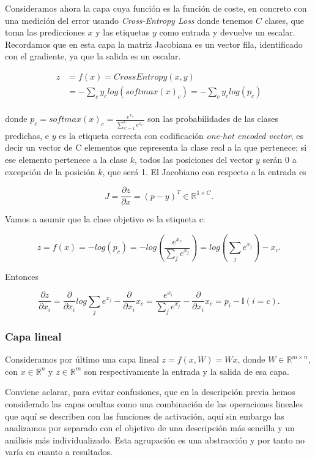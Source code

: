 Consideramos ahora la capa cuya función es la función de coste, en concreto con una medición del error usando \textit{Cross-Entropy Loss} donde tenemos $C$ clases, que toma las predicciones $x$ y las etiquetas $y$ como entrada y devuelve un escalar. Recordamos que en esta capa la matriz Jacobiana es un vector fila, identificado con el gradiente, ya que la salida es un escalar.

\begin{align*}
	z&=f(x)=CrossEntropy(x,y) \\
	&= - \sum_c y_c log(softmax(x)_c) = - \sum_c y_c log(p_c)\\
\end{align*}

donde $p_c=softmax(x)_c= \frac{e^{x_c}}{\sum_{c'=1}^C e^{x_{c'}}}$ son las probabilidades de las clases predichas, e $y$ es la etiqueta correcta con codificación \textit{one-hot encoded vector}, es decir un vector de C elementos que representa la clase real a la que pertenece; si ese elemento pertenece a la clase $k$, todos las posiciones del vector $y$ serán 0 a excepción de la posición $k$, que será 1. El Jacobiano con respecto a la entrada es

$$J= \frac{\partial z}{\partial x}= (p-y)^T \in \mathbb{R}^{1\times C}.$$

Vamos a asumir que la clase objetivo es la etiqueta c:

$$z=f(x)=-log(p_c)=-log \left (\frac{e^{x_c}}{\sum_j e^{x_j}} \right ) = log \left ( \sum_j e^{x_j} \right ) - x_c.$$

Entonces

$$\frac{\partial z}{\partial x_i} = \frac{\partial}{\partial x_i} log \sum_j e^{x_j} - \frac{\partial}{\partial x_i}x_c = \frac{e^{x_i}}{\sum_j e^{x_j}} - \frac{\partial}{\partial x_i}x_c = p_i - \mathbb{I}(i=c).$$

\subsubsection{Capa lineal}



Consideramos por último una capa lineal $z=f(x,W)=Wx$, donde $W \in \mathbb{R}^{m \times n}$, con $x \in \mathbb{R}^n$ y $z \in \mathbb{R}^m$ son respectivamente la entrada y la salida de esa capa.

Conviene aclarar, para evitar confusiones, que en la descripción previa hemos considerado las capas ocultas como una combinación de las operaciones lineales que aquí se describen con las funciones de activación, aquí sin embargo las analizamos por separado con el objetivo de una descripción más sencilla y un análisis más individualizado. Esta agrupación es una abstracción y por tanto no varía en cuanto a resultados.


